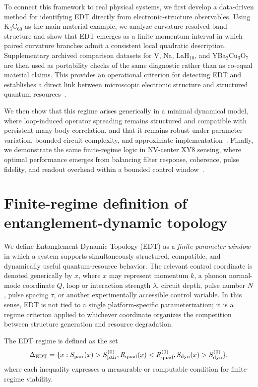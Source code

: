 \documentclass[twocolumn,10pt]{article}
\begin{document}
To connect this framework to real physical systems, we first develop a data-driven method for identifying EDT directly from electronic-structure observables. Using K$_3$C$_{60}$ as the main material example, we analyze curvature-resolved band structure and show that EDT emerges as a finite momentum interval in which paired curvature branches admit a consistent local quadratic description. Supplementary archived comparison datasets for V, Na, LaH$_{10}$, and YBa$_2$Cu$_3$O$_7$ are then used as portability checks of the same diagnostic rather than as co-equal material claims. This provides an operational criterion for detecting EDT and establishes a direct link between microscopic electronic structure and structured quantum resources~\cite{Gunnarsson1997,Capone2009}.

We then show that this regime arises generically in a minimal dynamical model, where loop-induced operator spreading remains structured and compatible with persistent many-body correlation, and that it remains robust under parameter variation, bounded circuit complexity, and approximate implementation~\cite{Lloyd1996,Childs2019}. Finally, we demonstrate the same finite-regime logic in NV-center XY8 sensing, where optimal performance emerges from balancing filter response, coherence, pulse fidelity, and readout overhead within a bounded control window~\cite{Degen2017,Barry2020,Casola2018}.


\section{Finite-regime definition of entanglement-dynamic topology}

We define Entanglement-Dynamic Topology (EDT) as a \emph{finite parameter window} in which a system supports simultaneously structured, compatible, and dynamically useful quantum-resource behavior. The relevant control coordinate is denoted generically by $x$, where $x$ may represent momentum $k$, a phonon normal-mode coordinate $Q$, loop or interaction strength $\lambda$, circuit depth, pulse number $N$, pulse spacing $\tau$, or another experimentally accessible control variable. In this sense, EDT is not tied to a single platform-specific parameterization; it is a regime criterion applied to whichever coordinate organizes the competition between structure generation and resource degradation.

The EDT regime is defined as the set
\begin{equation}
\Delta_{\rm EDT}
=
\{x: S_{\rm pair}(x) > S_{\rm pair}^{(0)},
R_{\rm quad}(x) < R_{\rm quad}^{(0)},
S_{\rm dyn}(x) > S_{\rm dyn}^{(0)} \},
\end{equation}
where each inequality expresses a measurable or computable condition for finite-regime viability.
\end{document}
